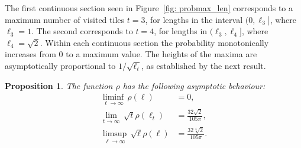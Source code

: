 \documentclass[12pt, a4paper]{article}
\newcommand{\probmax}{\rho} %
\newcommand{\len}{\ell} %
\newcommand{\tiles}{t} %
\newtheorem{proposition}{Proposition}%
\begin{document}
The first continuous section seen in Figure~\ref{fig: probmax_len} corresponds to a maximum number of visited tiles $\tiles=3$, for lengths in the interval $(0, \len_3]$, where $\len_3= 1$. The second corresponds to $\tiles=4$, for lengths in $(\len_3, \len_4]$, where $\len_4= \sqrt{2}$. Within each continuous section the probability monotonically increases from $0$ to a maximum value. The heights of the maxima are asymptotically proportional to $1/\sqrt{\len_\tiles}$, as established by the next result.

\begin{proposition}
The function $\probmax$ has the following asymptotic behaviour:
\begin{align}
\label{eq: probmax liminf}
\liminf_{\len \rightarrow \infty}\, \probmax(\len) & = 0, \\ 
\label{eq: probmax lim sqrt tiles}
\lim_{\tiles \rightarrow \infty}\, \sqrt{\tiles} \probmax(\len_\tiles) & = \frac {32\sqrt{2}}{105\pi}, \\
\label{eq: probmax limsup sqrt len}
\limsup_{\len \rightarrow \infty}\, \sqrt{\len} \probmax(\len) & = \frac {32\sqrt[4]{2}}{105\pi}.
\end{align}
\end{proposition}
\end{document}
